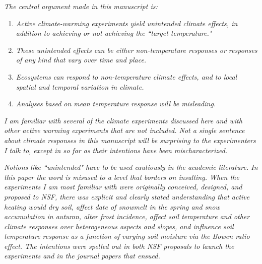 \documentclass[11pt,a4paper]{letter}
\begin{document}
\emph{The central argument made in this manuscript is:}
\begin{enumerate}
\item \emph{Active climate-warming experiments yield unintended climate effects, in addition to achieving or not achieving the ``target temperature."}   
\item \emph{These unintended effects can be either non-temperature responses or responses of any kind that vary over time and place.}
\item \emph{Ecosystems can respond to non-temperature climate effects, and to local spatial and temporal variation in climate.}
\item \emph{Analyses based on mean temperature response will be misleading.}
\end{enumerate}

\emph{I am familiar with several of the climate experiments discussed here and with other active warming experiments that are not included.  Not a single sentence about climate responses in this manuscript will be surprising to the experimenters I talk to, except in so far as their intentions have been mischaracterized.}  

\emph{Notions like ``unintended" have to be used cautiously in the academic literature.  In this paper the word is misused to a level that borders on insulting.  When the experiments I am most familiar with were originally conceived, designed, and proposed to NSF, there was explicit and clearly stated understanding that active heating would dry soil, affect date of snowmelt in the spring and snow accumulation in autumn, alter frost incidence, affect soil temperature and other climate responses over heterogeneous aspects and slopes, and influence soil temperature response as a function of varying soil moisture via the Bowen ratio effect.  The intentions were spelled out in both NSF proposals to launch the experiments and in the journal papers that ensued.}
\end{document}
